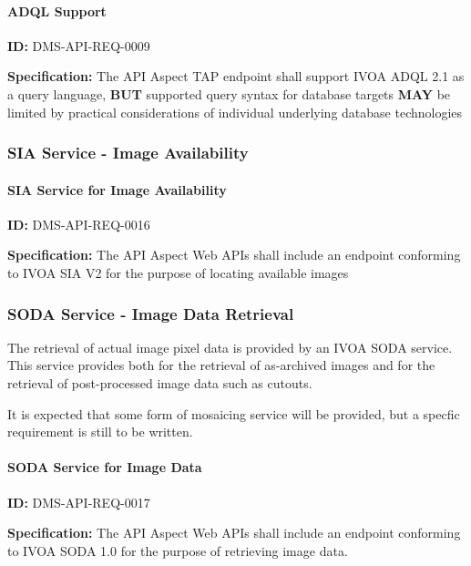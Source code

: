 \documentclass[SE,toc,lsstdraft]{lsstdoc}
\begin{document}
\paragraph{ADQL Support}\hfill  %

\label{DMS-API-REQ-0009}
\textbf{ID:} DMS-API-REQ-0009

\textbf{Specification:}
The API Aspect TAP endpoint shall support IVOA ADQL 2.1 as a query language, \textbf{BUT} supported query syntax for database targets \textbf{MAY} be limited by practical considerations of individual underlying database technologies

\subsubsection{SIA Service - Image Availability}

\paragraph{SIA Service for Image Availability}\hfill  %

\label{DMS-API-REQ-0016}
\textbf{ID:} DMS-API-REQ-0016

\textbf{Specification:}
The API Aspect Web APIs shall include an endpoint conforming to IVOA SIA V2 for the purpose of locating available images

\subsubsection{SODA Service - Image Data Retrieval}

The retrieval of actual image pixel data is provided by an IVOA SODA service.  This service provides both for the retrieval of as-archived images and for the retrieval of post-processed image data such as cutouts.

It is expected that some form of mosaicing service will be provided, but a specfic requirement is still to be written.

\paragraph{SODA Service for Image Data}\hfill  %

\label{DMS-API-REQ-0017}
\textbf{ID:} DMS-API-REQ-0017

\textbf{Specification:}
The API Aspect Web APIs shall include an endpoint conforming to IVOA SODA 1.0 for the purpose of retrieving image data.
\end{document}
